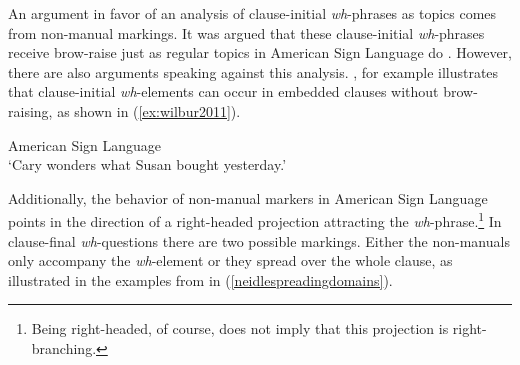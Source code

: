 %
%
%


\noindent An argument in favor of an analysis of clause-initial \textit{wh}-phrases as topics comes from non-manual markings. It was argued that these clause-initial \textit{wh}-phrases receive brow-raise just as regular topics in American Sign Language do \citep{neidle1998rightward, neidle2000syntax}. However, there are also arguments speaking against this analysis. \citet{wilbur2011nonmanuals}, for example illustrates that clause-initial \textit{wh}-elements can occur in embedded clauses without brow-raising, as shown in (\ref{ex:wilbur2011}).

\begin{exe}
\ex American Sign Language \citep[160]{wilbur2011nonmanuals} \\  
\glt `Cary wonders what Susan bought yesterday.' \label{ex:wilbur2011} 
\end{exe}

\noindent Additionally, the behavior of non-manual markers in American Sign Language points in the direction of a right-headed projection attracting the \textit{wh}-phrase.\footnote{ Being right-headed, of course, does not imply that this projection is right-branching.} In clause-final \textit{wh}-questions there are two possible markings. Either the non-manuals only accompany the \textit{wh}-element or they spread over the whole clause, as illustrated in the examples from \citet[76]{neidle2002language} in (\ref{neidlespreadingdomains}). 

